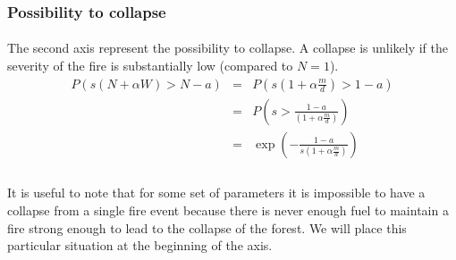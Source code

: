 \documentclass{article}
\begin{document}
\subsubsection{Possibility to collapse}


\paragraph{}
The second axis represent the possibility to collapse. A collapse is unlikely if the severity of the fire is substantially low (compared to $N = 1$). %
\[
\begin{array}{rccl}
P(s(N+\alpha W) > N-a ) & = & P(s(1+\alpha \frac{m}{d}) > 1-a ) \\
& = & P(s > \frac{1-a}{(1+\alpha \frac{m}{d})} ) \\
& = & \exp(-\frac{1-a}{s(1+\alpha\frac{m}{d})}) \\ 
\end{array}
\]


\paragraph{}
It is useful to note that for some set of parameters it is impossible to have a collapse from a single fire event because there is never enough fuel to maintain a fire strong enough to lead to the collapse of the forest. We will place this particular situation at the beginning of the axis.

\end{document}
